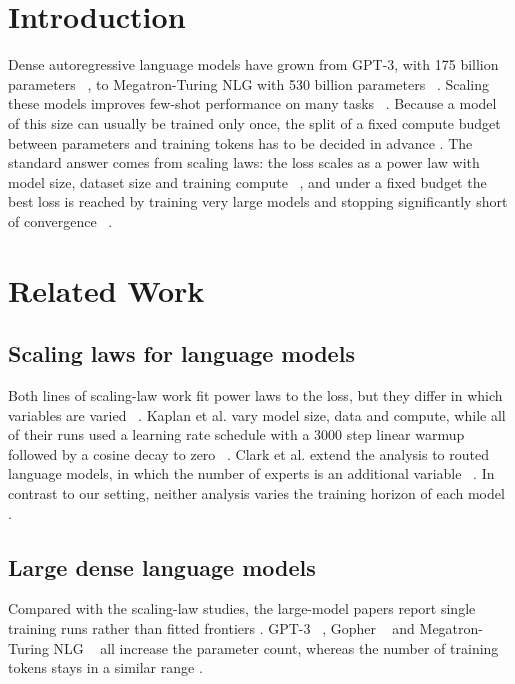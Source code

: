 \section{Introduction}

Dense autoregressive language models have grown from GPT-3, with 175 billion parameters ~\cite{brown2020}, to Megatron-Turing NLG with 530 billion parameters ~\cite{smith2022}. Scaling these models improves few-shot performance on many tasks ~\cite{brown2020}. Because a model of this size can usually be trained only once, the split of a fixed compute budget between parameters and training tokens has to be decided in advance . The standard answer comes from scaling laws: the loss scales as a power law with model size, dataset size and training compute ~\cite{kaplan2020}, and under a fixed budget the best loss is reached by training very large models and stopping significantly short of convergence ~\cite{kaplan2020}.

\section{Related Work}

\subsection{Scaling laws for language models}

Both lines of scaling-law work fit power laws to the loss, but they differ in which variables are varied ~\cite{kaplan2020,clark2022}. Kaplan et al. vary model size, data and compute, while all of their runs used a learning rate schedule with a 3000 step linear warmup followed by a cosine decay to zero ~\cite{kaplan2020}. Clark et al. extend the analysis to routed language models, in which the number of experts is an additional variable ~\cite{clark2022}. In contrast to our setting, neither analysis varies the training horizon of each model .

\subsection{Large dense language models}

Compared with the scaling-law studies, the large-model papers report single training runs rather than fitted frontiers . GPT-3 ~\cite{brown2020}, Gopher ~\cite{rae2021} and Megatron-Turing NLG ~\cite{smith2022} all increase the parameter count, whereas the number of training tokens stays in a similar range .


